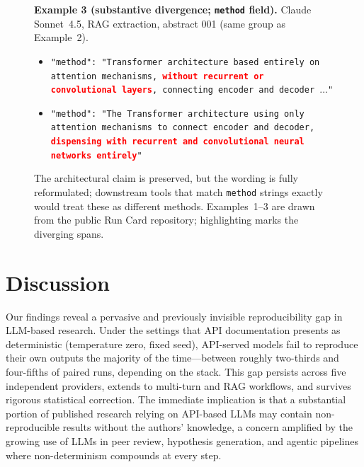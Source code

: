 \documentclass[sn-nature]{sn-jnl}
\begin{document}
\begin{figure}[t]
{\begin{minipage}{0.94\textwidth}
\medskip
\noindent\textbf{Example 3 (substantive divergence; \texttt{method} field).}
Claude Sonnet~4.5, RAG extraction, abstract 001 (same group as Example~2).
\begin{itemize}
\item[Run~A:] \texttt{"method": "Transformer architecture based entirely on attention mechanisms, \textcolor{red}{\textbf{without recurrent or convolutional layers}}, connecting encoder and decoder $\ldots$"}
\item[Run~B:] \texttt{"method": "The Transformer architecture using only attention mechanisms to connect encoder and decoder, \textcolor{red}{\textbf{dispensing with recurrent and convolutional neural networks entirely}}"}
\end{itemize}
The architectural claim is preserved, but the wording is fully reformulated; downstream tools that match \texttt{method} strings exactly would treat these as different methods.
\medskip
{\footnotesize Examples~1--3 are drawn from the public Run Card repository; highlighting marks the diverging spans.}
\end{minipage}}
\end{figure}


\section{Discussion}\label{sec:discussion}

Our findings reveal a pervasive and previously invisible reproducibility gap in LLM-based research.
Under the settings that API documentation presents as deterministic (temperature zero, fixed seed), API-served models fail to reproduce their own outputs the majority of the time---between roughly two-thirds and four-fifths of paired runs, depending on the stack.
This gap persists across five independent providers, extends to multi-turn and RAG workflows, and survives rigorous statistical correction.
The immediate implication is that a substantial portion of published research relying on API-based LLMs may contain non-reproducible results without the authors' knowledge, a concern amplified by the growing use of LLMs in peer review\cite{thakkar2026llm}, hypothesis generation\cite{xin2025agentic}, and agentic pipelines where non-determinism compounds at every step.
\end{document}
